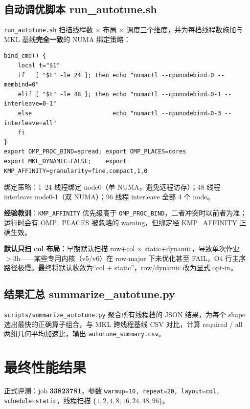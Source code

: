 \documentclass[11pt,a4paper,fontset=fandol]{ctexart}
\begin{document}
\subsection{自动调优脚本 run\_autotune.sh}
\texttt{run\_autotune.sh} 扫描线程数 $\times$ 布局 $\times$ 调度三个维度，并为每档线程数施加与 MKL 基线\textbf{完全一致}的 NUMA 绑定策略：
\begin{lstlisting}[style=bashstyle]
bind_cmd() {
    local t="$1"
    if   [ "$t" -le 24 ]; then echo "numactl --cpunodebind=0 --membind=0"
    elif [ "$t" -le 48 ]; then echo "numactl --cpunodebind=0-1 --interleave=0-1"
    else                       echo "numactl --cpunodebind=0-3 --interleave=all"
    fi
}
export OMP_PROC_BIND=spread; export OMP_PLACES=cores
export MKL_DYNAMIC=FALSE;    export KMP_AFFINITY=granularity=fine,compact,1,0
\end{lstlisting}
绑定策略：1--24 线程绑定 node0（单 NUMA，避免远程访存）；48 线程 interleave node0-1（双 NUMA）；96 线程 interleave 全部 4 个 node。

\textbf{经验教训}：\texttt{KMP\_AFFINITY} 优先级高于 \texttt{OMP\_PROC\_BIND}，二者冲突时以前者为准；运行时会有 OMP\_PLACES 被忽略的 warning，但绑定经 KMP\_AFFINITY 正确生效。

\textbf{默认只扫 col 布局}：早期默认扫描 row+col $\times$ static+dynamic，导致单次作业 $>$3h——某些专用内核（v5/v6）在 row-major 下未优化甚至 FAIL，O4 行主序路径极慢。最终将默认收敛为“col + static”，row/dynamic 改为显式 opt-in。

\subsection{结果汇总 summarize\_autotune.py}
\texttt{scripts/summarize\_autotune.py} 聚合所有线程档的 JSON 结果，为每个 shape 选出最快的正确算子组合，与 MKL 跨线程基线 CSV 对比，计算 required / all 两组几何平均加速比，输出 \texttt{autotune\_summary.csv}。

\section{最终性能结果}
正式评测：job \textbf{33823781}，参数 \texttt{warmup=10, repeat=20, layout=col, schedule=static}，线程扫描 $\{1,2,4,8,16,24,48,96\}$。
\end{document}
